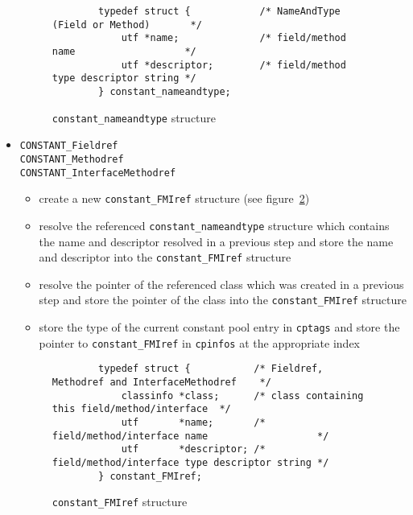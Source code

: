 \begin{itemize}
\begin{itemize}
  \end{itemize}

\begin{figure}[h]
\begin{verbatim}
        typedef struct {            /* NameAndType (Field or Method)       */
            utf *name;              /* field/method name                   */
            utf *descriptor;        /* field/method type descriptor string */
        } constant_nameandtype;
\end{verbatim}
\caption{\texttt{constant\_nameandtype} structure}
\label{constantnameandtype}
\end{figure}

 \item \texttt{CONSTANT\_Fieldref} \\
       \texttt{CONSTANT\_Methodref} \\
       \texttt{CONSTANT\_InterfaceMethodref}

  \begin{itemize}

   \item create a new \texttt{constant\_FMIref} structure (see
   figure~\ref{constantFMIref})

   \item resolve the referenced \texttt{constant\_nameandtype}
   structure which contains the name and descriptor resolved in a
   previous step and store the name and descriptor into the
   \texttt{constant\_FMIref} structure

   \item resolve the pointer of the referenced class which was created
   in a previous step and store the pointer of the class into the
   \texttt{constant\_FMIref} structure

   \item store the type of the current constant pool entry in
   \texttt{cptags} and store the pointer to \texttt{constant\_FMIref}
   in \texttt{cpinfos} at the appropriate index

  \end{itemize}

\begin{figure}[h]
\begin{verbatim}
        typedef struct {           /* Fieldref, Methodref and InterfaceMethodref    */
            classinfo *class;      /* class containing this field/method/interface  */
            utf       *name;       /* field/method/interface name                   */
            utf       *descriptor; /* field/method/interface type descriptor string */
        } constant_FMIref;
\end{verbatim}
\caption{\texttt{constant\_FMIref} structure}
\label{constantFMIref}
\end{figure}

\end{itemize}

